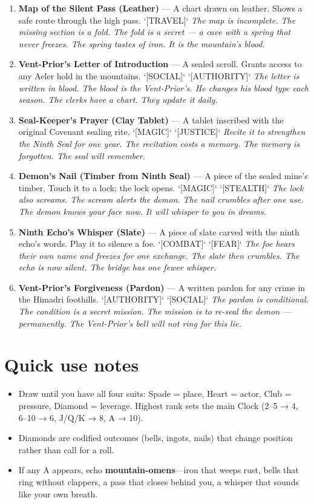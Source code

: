 \begin{enumerate}
\item \textbf{Map of the Silent Pass (Leather)} --- A chart drawn on leather. Shows a safe route through the high pass. `[TRAVEL]`
  \hfill \textit{The map is incomplete. The missing section is a fold. The fold is a secret — a cave with a spring that never freezes. The spring tastes of iron. It is the mountain's blood.}
\item \textbf{Vent-Prior's Letter of Introduction} --- A sealed scroll. Grants access to any Aeler hold in the mountains. `[SOCIAL]` `[AUTHORITY]`
  \hfill \textit{The letter is written in blood. The blood is the Vent-Prior's. He changes his blood type each season. The clerks have a chart. They update it daily.}
\item[J] \textbf{Seal-Keeper's Prayer (Clay Tablet)} --- A tablet inscribed with the original Covenant sealing rite. `[MAGIC]` `[JUSTICE]`
  \hfill \textit{Recite it to strengthen the Ninth Seal for one year. The recitation costs a memory. The memory is forgotten. The seal will remember.}
\item[Q] \textbf{Demon's Nail (Timber from Ninth Seal)} --- A piece of the sealed mine's timber. Touch it to a lock; the lock opens. `[MAGIC]` `[STEALTH]`
  \hfill \textit{The lock also screams. The scream alerts the demon. The nail crumbles after one use. The demon knows your face now. It will whisper to you in dreams.}
\item[K] \textbf{Ninth Echo's Whisper (Slate)} --- A piece of slate carved with the ninth echo's words. Play it to silence a foe. `[COMBAT]` `[FEAR]`
  \hfill \textit{The foe hears their own name and freezes for one exchange. The slate then crumbles. The echo is now silent. The bridge has one fewer whisper.}
\item[A] \textbf{Vent-Prior's Forgiveness (Pardon)} --- A written pardon for any crime in the Himadri foothills. `[AUTHORITY]` `[SOCIAL]`
  \hfill \textit{The pardon is conditional. The condition is a secret mission. The mission is to re-seal the demon — permanently. The Vent-Prior's bell will not ring for this lie.}
\end{enumerate}

\section*{Quick use notes}
\label{sec:himadri-quick-use}
\begin{itemize}
\item Draw until you have all four suits: Spade = place, Heart = actor, Club = pressure, Diamond = leverage. Highest rank sets the main Clock (2–5 → 4, 6–10 → 6, J/Q/K → 8, A → 10).
\item Diamonds are codified outcomes (bells, ingots, nails) that change position rather than call for a roll.
\item If any A appears, echo \textbf{mountain-omens}—iron that weeps rust, bells that ring without clappers, a pass that closes behind you, a whisper that sounds like your own breath.
\end{itemize}

